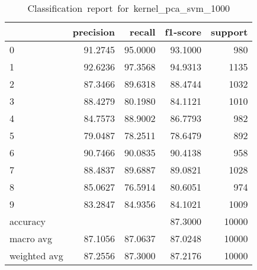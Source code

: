 \begin{table}[htb!]
    \centering
    \begin{tabular}{lrrrr}
        \toprule
                     & precision & recall  & f1-score & support \\
        \midrule
        0            & 91.2745   & 95.0000 & 93.1000  & 980     \\
        1            & 92.6236   & 97.3568 & 94.9313  & 1135    \\
        2            & 87.3466   & 89.6318 & 88.4744  & 1032    \\
        3            & 88.4279   & 80.1980 & 84.1121  & 1010    \\
        4            & 84.7573   & 88.9002 & 86.7793  & 982     \\
        5            & 79.0487   & 78.2511 & 78.6479  & 892     \\
        6            & 90.7466   & 90.0835 & 90.4138  & 958     \\
        7            & 88.4837   & 89.6887 & 89.0821  & 1028    \\
        8            & 85.0627   & 76.5914 & 80.6051  & 974     \\
        9            & 83.2847   & 84.9356 & 84.1021  & 1009    \\
        accuracy     &           &         & 87.3000  & 10000   \\
        macro avg    & 87.1056   & 87.0637 & 87.0248  & 10000   \\
        weighted avg & 87.2556   & 87.3000 & 87.2176  & 10000   \\
        \bottomrule
    \end{tabular}
    \caption{Classification\ report\ for\ kernel\_pca\_svm\_1000}
    \label{tab:classification-report-kernel_pca_svm_1000}
\end{table}
